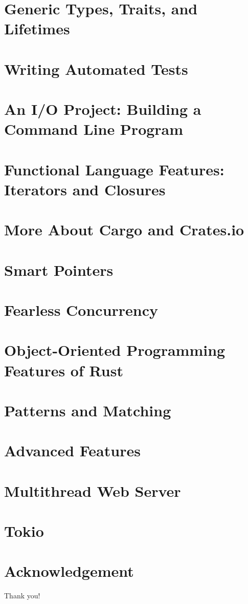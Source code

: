 \documentclass{beamer}
\begin{document}
\section{Generic Types, Traits, and Lifetimes}
\section{Writing Automated Tests}
\section{An I/O Project: Building a Command Line Program}
\section{Functional Language Features: Iterators and Closures}
\section{More About Cargo and Crates.io}
\section{Smart Pointers}
\section{Fearless Concurrency}
\section{Object-Oriented Programming Features of Rust}
\section{Patterns and Matching}
\section{Advanced Features}
\section{Multithread Web Server}
\section{Tokio}

\section*{Acknowledgement}
\begin{frame}
	\Huge{\centerline{Thank you!}}
\end{frame}
\end{document}

